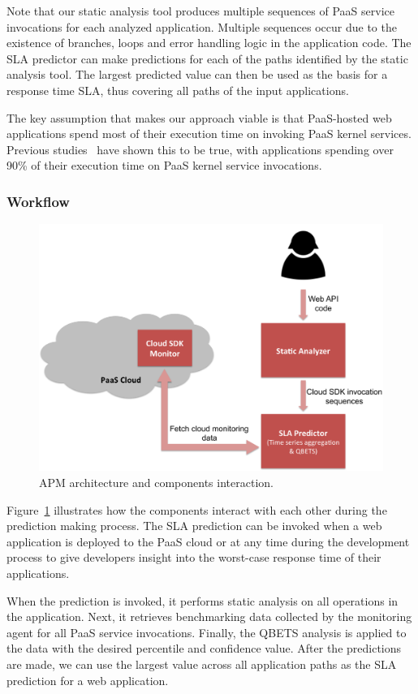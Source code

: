 \documentclass[11pt]{article}
\begin{document}
Note that our static analysis tool produces multiple sequences of PaaS service invocations for each
analyzed application. Multiple sequences occur due to the existence of branches, loops and error handling
logic in the application code. The SLA predictor can make predictions for each of the paths identified
by the static analysis tool.  The largest predicted value can then be used as the basis for a response time
SLA, thus covering all paths of the input applications.

The key assumption that makes our approach viable is that PaaS-hosted web applications spend most of
their execution time on invoking PaaS kernel services. 
Previous studies~\cite{Jayathilaka:2015:RTS:2806777.2806842} have shown this to be true,
with applications spending over 90\% of their execution time on PaaS kernel service invocations.

\subsubsection{Workflow}
\begin{figure}
\centering
\includegraphics[scale=0.35]{apm_flow}
\caption{APM architecture and components interaction.}
\label{fig:apm_flow}
\end{figure}
Figure~\ref{fig:apm_flow} illustrates how the components interact with each other during the prediction making process.
The SLA prediction can be invoked when a web application is deployed to the PaaS cloud or at any time during the development process to give
developers insight into the worst-case response time of their applications.

When the prediction is invoked, it performs static analysis on all operations in the application. Next, it retrieves benchmarking data collected by
the monitoring agent for all PaaS service invocations. Finally, the QBETS analysis is applied to the data with the desired percentile and confidence value.
After the predictions are made, we can use the largest value across all application paths as the SLA prediction for a web application.
\end{document}
